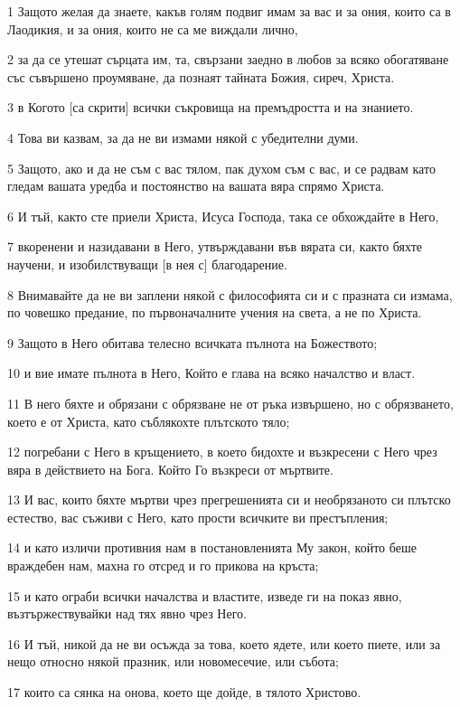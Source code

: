\par 1 Защото желая да знаете, какъв голям подвиг имам за вас и за ония, които са в Лаодикия, и за ония, които не са ме виждали лично,
\par 2 за да се утешат сърцата им, та, свързани заедно в любов за всяко обогатяване със съвършено проумяване, да познаят тайната Божия, сиреч, Христа.
\par 3 в Когото [са скрити] всички съкровища на премъдростта и на знанието.
\par 4 Това ви казвам, за да не ви измами някой с убедителни думи.
\par 5 Защото, ако и да не съм с вас тялом, пак духом съм с вас, и се радвам като гледам вашата уредба и постоянство на вашата вяра спрямо Христа.
\par 6 И тъй, както сте приели Христа, Исуса Господа, така се обхождайте в Него,
\par 7 вкоренени и назидавани в Него, утвърждавани във вярата си, както бяхте научени, и изобилствуващи [в нея с] благодарение.
\par 8 Внимавайте да не ви заплени някой с философията си и с празната си измама, по човешко предание, по първоначалните учения на света, а не по Христа.
\par 9 Защото в Него обитава телесно всичката пълнота на Божеството;
\par 10 и вие имате пълнота в Него, Който е глава на всяко началство и власт.
\par 11 В него бяхте и обрязани с обрязване не от ръка извършено, но с обрязването, което е от Христа, като съблякохте плътското тяло;
\par 12 погребани с Него в кръщението, в което бидохте и възкресени с Него чрез вяра в действието на Бога. Който Го възкреси от мъртвите.
\par 13 И вас, които бяхте мъртви чрез прегрешенията си и необрязаното си плътско естество, вас съживи с Него, като прости всичките ви престъпления;
\par 14 и като изличи противния нам в постановленията Му закон, който беше враждебен нам, махна го отсред и го прикова на кръста;
\par 15 и като ограби всички началства и властите, изведе ги на показ явно, възтържествувайки над тях явно чрез Него.
\par 16 И тъй, никой да не ви осъжда за това, което ядете, или което пиете, или за нещо относно някой празник, или новомесечие, или събота;
\par 17 които са сянка на онова, което ще дойде, в тялото Христово.
